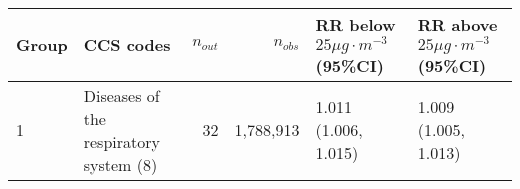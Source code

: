 \begin{tabular}{lp{6.5cm}rrp{2.2cm}p{2.2cm}}
  \hline
Group & CCS codes & $n_{out}$ & $n_{obs}$ & RR below $25 \mu g \cdot m^{-3}$ (95\%CI) & RR above $25 \mu g \cdot m^{-3}$ (95\%CI) \\ 
  \hline
   1 & Diseases of the respiratory system (8) &   32 & 1,788,913 & 1.011 (1.006, 1.015) & 1.009 (1.005, 1.013) \\ 
   \hline
\end{tabular}

